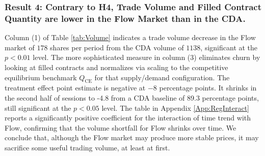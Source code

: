 \documentclass[12pt]{article}
\begin{document}
\subsubsection*{Result 4: Contrary to H4, Trade Volume and Filled Contract Quantity are lower in the Flow Market than in the CDA.}

Column (1) of Table \ref{tab:Volume} indicates a trade volume decrease in the Flow market of $178$ shares per period from the CDA volume of $1138$, significant at the $p<0.01$ level. %
The more sophisticated measure in column (3) eliminates churn by looking at filled contracts and normalizes via scaling to the competitive equilibrium benchmark \(Q_{\text{CE}}\) for that supply/demand configuration. 
The treatment effect point estimate is negative at $-8$ percentage points.
It shrinks in the second half of sessions to -4.8 from a CDA baseline of 89.3 percentage points, still significant at the $p<0.05$ level. 
The table in Appendix \ref{App:RegInteract} reports a significantly positive coefficient for the interaction of time trend with Flow,
confirming that the volume shortfall for Flow shrinks over time.
We conclude that, although the Flow market may produce more stable prices, it may sacrifice some useful trading volume, at least at first. 

\end{document}
